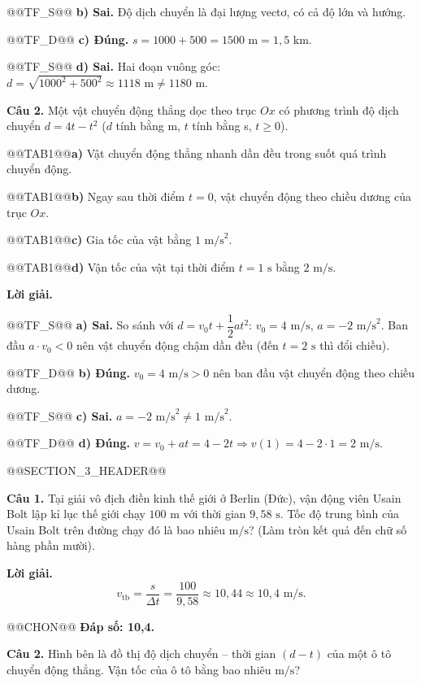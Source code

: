\documentclass{article}
\begin{document}
@@TF_S@@ \textbf{b) Sai.} Độ dịch chuyển là đại lượng vectơ, có cả độ lớn và hướng.

@@TF_D@@ \textbf{c) Đúng.} $s = 1000 + 500 = 1500\text{ m} = 1{,}5\text{ km}$.

@@TF_S@@ \textbf{d) Sai.} Hai đoạn vuông góc: $d = \sqrt{1000^2 + 500^2} \approx 1118\text{ m} \ne 1180\text{ m}$.

\textbf{Câu 2.} Một vật chuyển động thẳng dọc theo trục $Ox$ có phương trình độ dịch chuyển $d = 4t - t^2$ ($d$ tính bằng m, $t$ tính bằng s, $t \ge 0$).

@@TAB1@@\textbf{a)} Vật chuyển động thẳng nhanh dần đều trong suốt quá trình chuyển động.

@@TAB1@@\textbf{b)} Ngay sau thời điểm $t = 0$, vật chuyển động theo chiều dương của trục $Ox$.

@@TAB1@@\textbf{c)} Gia tốc của vật bằng $1\text{ m/s}^2$.

@@TAB1@@\textbf{d)} Vận tốc của vật tại thời điểm $t = 1\text{ s}$ bằng $2\text{ m/s}$.

\textbf{Lời giải.}

@@TF_S@@ \textbf{a) Sai.} So sánh với $d = v_0t + \dfrac{1}{2}at^2$: $v_0 = 4\text{ m/s}$, $a = -2\text{ m/s}^2$. Ban đầu $a \cdot v_0 < 0$ nên vật chuyển động chậm dần đều (đến $t = 2\text{ s}$ thì đổi chiều).

@@TF_D@@ \textbf{b) Đúng.} $v_0 = 4\text{ m/s} > 0$ nên ban đầu vật chuyển động theo chiều dương.

@@TF_S@@ \textbf{c) Sai.} $a = -2\text{ m/s}^2 \ne 1\text{ m/s}^2$.

@@TF_D@@ \textbf{d) Đúng.} $v = v_0 + at = 4 - 2t \Rightarrow v(1) = 4 - 2 \cdot 1 = 2\text{ m/s}$.

@@SECTION_3_HEADER@@

\textbf{Câu 1.} Tại giải vô địch điền kinh thế giới ở Berlin (Đức), vận động viên Usain Bolt lập kỉ lục thế giới chạy $100\text{ m}$ với thời gian $9{,}58\text{ s}$. Tốc độ trung bình của Usain Bolt trên đường chạy đó là bao nhiêu $\text{m/s}$? (Làm tròn kết quả đến chữ số hàng phần mười).

\textbf{Lời giải.} \[v_{\text{tb}} = \frac{s}{\Delta t} = \frac{100}{9{,}58} \approx 10{,}44 \approx 10{,}4\text{ m/s}.\]

@@CHON@@ \textbf{Đáp số: 10,4.}

\textbf{Câu 2.} Hình bên là đồ thị độ dịch chuyển -- thời gian $(d - t)$ của một ô tô chuyển động thẳng. Vận tốc của ô tô bằng bao nhiêu $\text{m/s}$?
\end{document}
